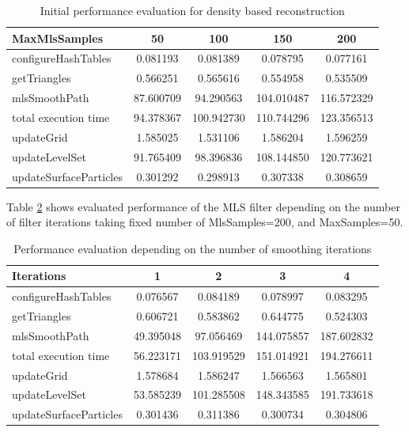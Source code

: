 \begin{table}[H]
	\begin{center}
		\scriptsize
		\begin{tabular}{|l|c|c|c|c|}
			\hline
			MaxMlsSamples & 50 & 100 & 150 & 200 \\
			\hline
			configureHashTables     	& 0.081193	&	0.081389	& 0.078795		& 0.077161\\
			getTriangles    			& 0.566251	&	0.565616	& 0.554958		& 0.535509\\
			mlsSmoothPath   			& 87.600709	&	94.290563	& 104.010487	& 116.572329\\
			total execution time    	& 94.378367	&	100.942730	& 110.744296	& 123.356513\\
			updateGrid      			& 1.585025	&	1.531106	& 1.586204		& 1.596259\\
			updateLevelSet  			& 91.765409	&	98.396836	& 108.144850	& 120.773621\\
			updateSurfaceParticles  	& 0.301292	&	0.298913	& 0.307338		& 0.308659\\
			\hline
		\end{tabular}
	\end{center}
	\caption{Initial performance evaluation for density based reconstruction}
	\label{tab:mls_mms_perf}
\end{table}
Table \ref{tab:mls_iter_perf} shows evaluated performance of the MLS filter depending on the number of filter iterations taking fixed number of MlsSamples=200, and MaxSamples=50.
\begin{table}[H]
	\begin{center}
		\scriptsize
		\begin{tabular}{|l|c|c|c|c|}
			\hline
			Iterations & 1 & 2 & 3 & 4 \\
			\hline
			configureHashTables     	& 0.076567	&	0.084189	& 0.078997		& 0.083295\\
			getTriangles    			& 0.606721	&	0.583862	& 0.644775		& 0.524303\\
			mlsSmoothPath   			& 49.395048	&	97.056469	& 144.075857	& 187.602832\\
			total execution time    	& 56.223171	&	103.919529	& 151.014921	& 194.276611\\
			updateGrid      			& 1.578684	&	1.586247	& 1.566563		& 1.565801\\
			updateLevelSet  			& 53.585239	&	101.285508	& 148.343585	& 191.733618\\
			updateSurfaceParticles  	& 0.301436	&	0.311386	& 0.300734		& 0.304806\\
			\hline
		\end{tabular}
	\end{center}
	\caption{Performance evaluation depending on the number of smoothing iterations}
	\label{tab:mls_iter_perf}
\end{table}

